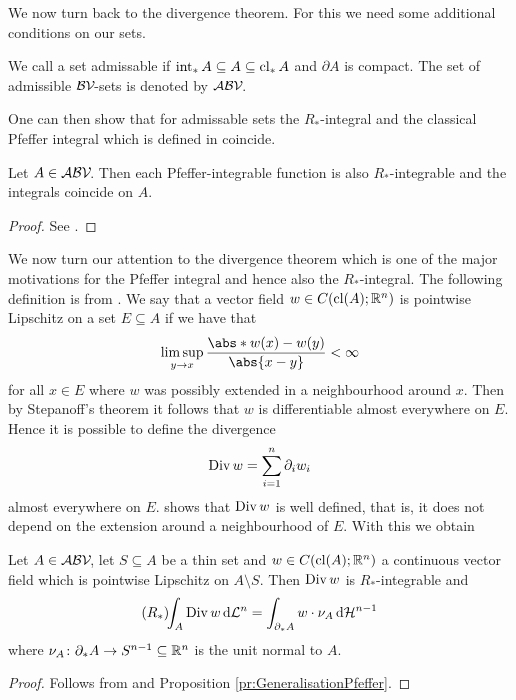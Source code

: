 \noindent We now turn back to the divergence theorem. For this we need some additional conditions on our sets.

\begin{definition}
We call a set admissable if $\operatorname{int}_*A\subseteq A\subseteq \operatorname{cl}_*A$ and $\partial A$ is compact. The set of admissible $\mathcal{BV\!}$-sets is denoted by $\mathcal{ABV\!}$.
\end{definition}

\noindent
One can then show that for admissable sets the $R_*$-integral and the classical Pfeffer integral which is defined in \cite{Pfe1992} coincide.

\begin{proposition}\label{pr:GeneralisationPfeffer}
Let $A\in\mathcal{ABV\!}$. Then each Pfeffer-integrable function is also $R_*$-integrable and the integrals coincide on $A$.
\end{proposition}
\begin{proof}
See \cite[Corollary 3.18]{Pfe2016}.
\end{proof}

\noindent We now turn our attention to the divergence theorem which is one of the major motivations for the Pfeffer integral and hence also the $R_*$-integral.
The following definition is from \cite{Pfe1991}.
We say that a vector field $w\in C(\operatorname{cl}(A);\mathbb{R}^n)$ is pointwise Lipschitz on a set $E\subseteq A$ if we have that
\begin{align*}
	\limsup_{y\to x}\frac{\abs*{w(x)-w(y)}}{\abs{x-y}}<\infty
\end{align*}
for all $x\in E$ where $w$ was possibly extended in a neighbourhood around $x$. Then by Stepanoff's theorem it follows that $w$ is differentiable almost everywhere on $E$. Hence it is possible to define the divergence
\begin{align*}
	\operatorname{Div} w=\sum_{i=1}^n\partial_iw_i
\end{align*}
almost everywhere on $E$. \cite[Lemma 5.16]{Pfe1991} shows that $\operatorname{Div} w$ is well defined, that is, it does not depend on the extension around a neighbourhood of $E$. With this we obtain

\begin{theorem}\label{th:divergence}
Let $A\in\mathcal{ABV\!}$, let $S\subseteq A$ be a thin set and $w\in C(\operatorname{cl}(A);\mathbb{R}^n)$ a continuous vector field which is pointwise Lipschitz on $A\setminus S$. Then $\operatorname{Div} w$ is $R_*$-integrable and
\begin{align*}
	(R_*)\!\!\int_A\operatorname{Div} w\,\mathrm{d} \mathcal{L}^n=\int_{\partial_* A}w\cdot \nu_A\,\mathrm{d} \mathcal{H}^{n-1}
\end{align*}
where $\nu_A\colon \partial_* A\to S^{n-1}\subseteq\mathbb{R}^n$ is the unit normal to $A$.
\end{theorem}
\begin{proof}
Follows from \cite[Theorem 5.19]{Pfe1991} and Proposition \ref{pr:GeneralisationPfeffer}.
\end{proof}

